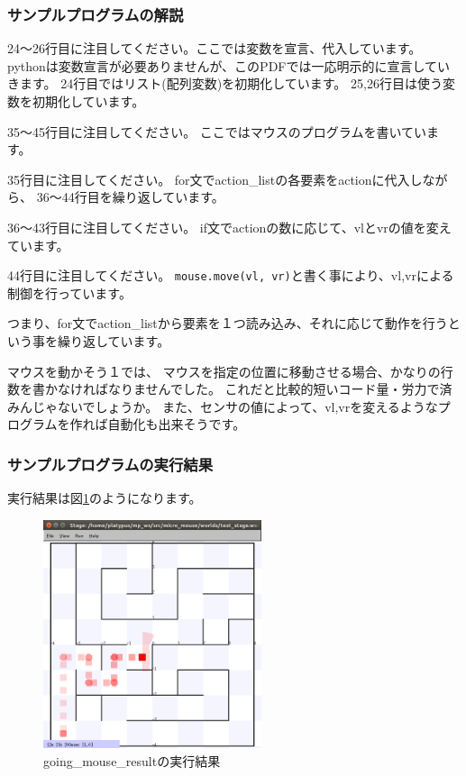 \documentclass[11pt,a4paper]{jsarticle}
\begin{document}
\subsubsection{サンプルプログラムの解説}
24〜26行目に注目してください。ここでは変数を宣言、代入しています。
pythonは変数宣言が必要ありませんが、このPDFでは一応明示的に宣言していきます。
24行目ではリスト(配列変数)を初期化しています。
25,26行目は使う変数を初期化しています。

35〜45行目に注目してください。
ここではマウスのプログラムを書いています。

35行目に注目してください。
for文でaction\_listの各要素をactionに代入しながら、
36〜44行目を繰り返しています。

36〜43行目に注目してください。
if文でactionの数に応じて、vlとvrの値を変えています。

44行目に注目してください。
\verb|mouse.move(vl, vr)|と書く事により、vl,vrによる制御を行っています。

つまり、for文でaction\_listから要素を１つ読み込み、それに応じて動作を行うという事を繰り返しています。

マウスを動かそう１では、
マウスを指定の位置に移動させる場合、かなりの行数を書かなければなりませんでした。
これだと比較的短いコード量・労力で済みんじゃないでしょうか。
また、センサの値によって、vl,vrを変えるようなプログラムを作れば自動化も出来そうです。



\subsubsection{サンプルプログラムの実行結果}
実行結果は図\ref{going_mouse_result}のようになります。
\begin{figure}[h]
  \begin{center}
    \includegraphics[width=64mm]{./going_mouse_result.png}
  \end{center}
  \label{going_mouse_result}
  \caption{going\_mouse\_resultの実行結果}
\end{figure}
\end{document}
